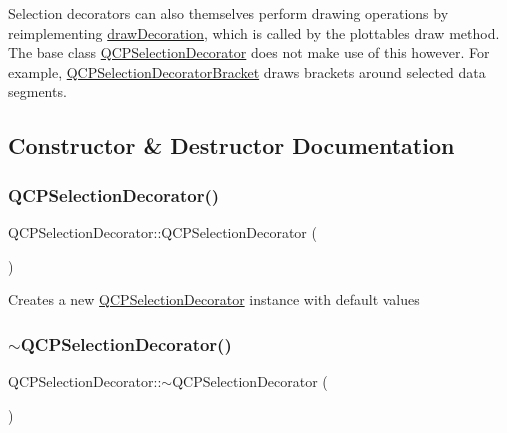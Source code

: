 Selection decorators can also themselves perform drawing operations by reimplementing \mbox{\hyperlink{class_q_c_p_selection_decorator_a4f8eb49e277063845391e803ae23054a}{draw\+Decoration}}, which is called by the plottable\textquotesingle{}s draw method. The base class \mbox{\hyperlink{class_q_c_p_selection_decorator}{Q\+C\+P\+Selection\+Decorator}} does not make use of this however. For example, \mbox{\hyperlink{class_q_c_p_selection_decorator_bracket}{Q\+C\+P\+Selection\+Decorator\+Bracket}} draws brackets around selected data segments. 

\subsection{Constructor \& Destructor Documentation}
\mbox{\label{class_q_c_p_selection_decorator_aa145480d9a062cd176fe30900bb7bca8}} 
\subsubsection{\texorpdfstring{QCPSelectionDecorator()}{QCPSelectionDecorator()}}
{\footnotesize\ttfamily Q\+C\+P\+Selection\+Decorator\+::\+Q\+C\+P\+Selection\+Decorator (\begin{DoxyParamCaption}{ }\end{DoxyParamCaption})}

Creates a new \mbox{\hyperlink{class_q_c_p_selection_decorator}{Q\+C\+P\+Selection\+Decorator}} instance with default values \mbox{\label{class_q_c_p_selection_decorator_ab211eb11379854dcbe23b1642be0d19e}} 
\subsubsection{\texorpdfstring{$\sim$QCPSelectionDecorator()}{~QCPSelectionDecorator()}}
{\footnotesize\ttfamily Q\+C\+P\+Selection\+Decorator\+::$\sim$\+Q\+C\+P\+Selection\+Decorator (\begin{DoxyParamCaption}{ }\end{DoxyParamCaption})\hspace{0.3cm}{\ttfamily [virtual]}}



